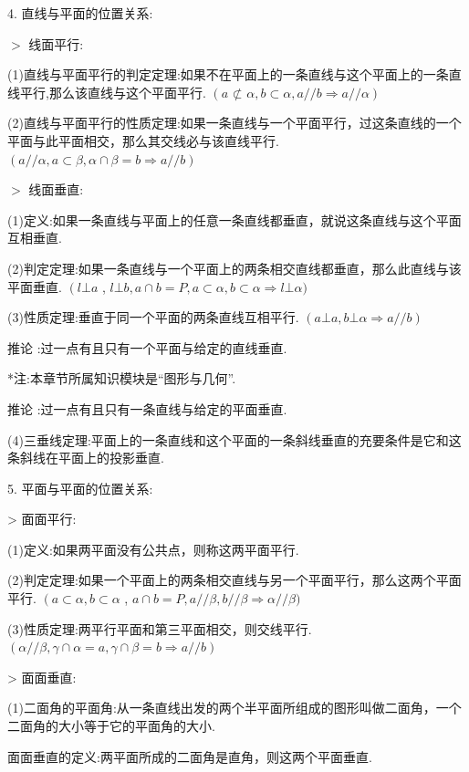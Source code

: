4. 直线与平面的位置关系:

$>$ 线面平行:

(1)直线与平面平行的判定定理:如果不在平面上的一条直线与这个平面上的一条直线平行,那么该直线与这个平面平行. $\left( {a \text{ ⊄ } \alpha ,b \subset  \alpha ,a//b \Rightarrow  a//\alpha }\right)$

(2)直线与平面平行的性质定理:如果一条直线与一个平面平行，过这条直线的一个平面与此平面相交，那么其交线必与该直线平行. $\left( {a//\alpha ,a \subset  \beta ,\alpha  \cap  \beta  = b \Rightarrow  a//b}\right)$

$>$ 线面垂直:

(1)定义:如果一条直线与平面上的任意一条直线都垂直，就说这条直线与这个平面互相垂直.

(2)判定定理:如果一条直线与一个平面上的两条相交直线都垂直，那么此直线与该平面垂直. $\left( {l \bot  a}\right.$ , $l \bot  b,a \cap  b = P,a \subset  \alpha ,b \subset  \alpha  \Rightarrow  l \bot  \alpha )$

(3)性质定理:垂直于同一个平面的两条直线互相平行. $\left( {a \bot  a,b \bot  \alpha  \Rightarrow  a//b}\right)$

推论  :过一点有且只有一个平面与给定的直线垂直.



*注:本章节所属知识模块是“图形与几何”.



推论  :过一点有且只有一条直线与给定的平面垂直.

(4)三垂线定理:平面上的一条直线和这个平面的一条斜线垂直的充要条件是它和这条斜线在平面上的投影垂直.

5. 平面与平面的位置关系:

> 面面平行:

(1)定义:如果两平面没有公共点，则称这两平面平行.

(2)判定定理:如果一个平面上的两条相交直线与另一个平面平行，那么这两个平面平行. $\left( {a \subset  \alpha ,b \subset  \alpha }\right.$ , $a \cap  b = P,a//\beta ,b//\beta  \Rightarrow  \alpha //\beta )$

(3)性质定理:两平行平面和第三平面相交，则交线平行. $\left( {\alpha //\beta ,\gamma  \cap  \alpha  = a,\gamma  \cap  \beta  = b \Rightarrow  a//b}\right)$

> 面面垂直:

(1)二面角的平面角:从一条直线出发的两个半平面所组成的图形叫做二面角，一个二面角的大小等于它的平面角的大小.

面面垂直的定义:两平面所成的二面角是直角，则这两个平面垂直.

